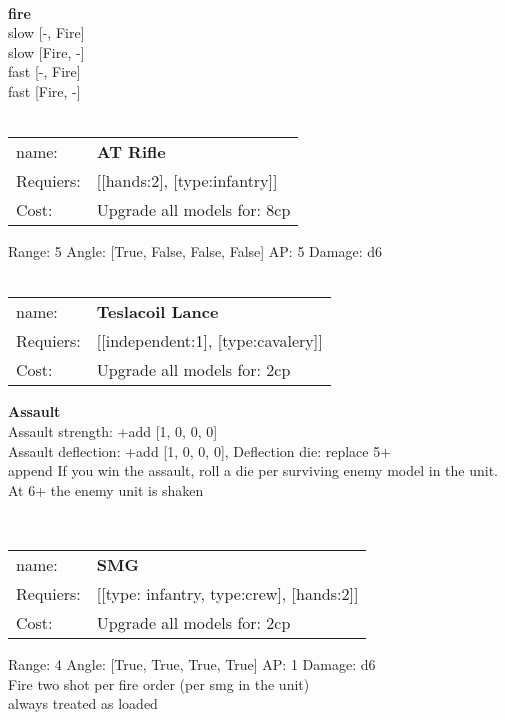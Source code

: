 \ \\ {\bf fire } \\
slow [-, Fire] \\
slow [Fire, -] \\
fast [-, Fire] \\
fast [Fire, -] \\

\ \\
\begin{tabular}{ll}
name: & {\bf AT Rifle } \\
Requiers: & [[hands:2], [type:infantry]] \\
Cost: & Upgrade all models for: 8cp \\
\end{tabular}



Range: 5  Angle: [True, False, False, False] AP: 5 Damage: d6 \\








\ \\
\begin{tabular}{ll}
name: & {\bf Teslacoil Lance } \\
Requiers: & [[independent:1], [type:cavalery]] \\
Cost: & Upgrade all models for: 2cp \\
\end{tabular}





{\bf Assault} \ \\
Assault strength: +add [1, 0, 0, 0] 
\\ 
Assault deflection: +add [1, 0, 0, 0], Deflection die: replace 5+
\\ 

append If you win the assault, roll a die per surviving enemy model in the unit. At 6+ the enemy unit is shaken


\ \\
\begin{tabular}{ll}
name: & {\bf SMG } \\
Requiers: & [[type: infantry, type:crew], [hands:2]] \\
Cost: & Upgrade all models for: 2cp \\
\end{tabular}



Range: 4  Angle: [True, True, True, True] AP: 1 Damage: d6 \\
Fire two shot per fire order (per smg in the unit)\\ 
always treated as loaded\\ 







